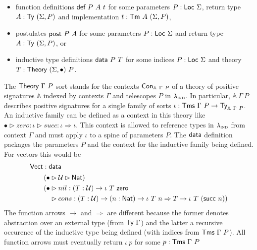 \begin{itemize}
	\item function definitions $\mta{def}\ P\ A\ t$ for some parameters $P : \textsf{Loc}\
		      \Sigma$, return type $A : \textsf{Ty}\ (\Sigma, P)$ and implementation $t : \textsf{Tm}\ A\ (\Sigma, P)$,
	\item postulates $\textsf{post}\ P\ A$ for some parameters $P : \textsf{Loc}\
		      \Sigma$ and return type $A : \textsf{Ty}\ (\Sigma, P)$, or
	\item inductive type definitions $\mta{data}\ P\ T$ for some indices $P :
		      \textsf{Loc}\ \Sigma$ and theory $T : \textsf{Theory}\ (\Sigma, \bullet)\ P$.
\end{itemize}

The $\textsf{Theory}\ \Gamma\ P$ sort stands for the contexts $\textsf{Con}_{\mathbb{A}\ \Gamma\
		P}$ of a theory of positive signatures \cite{Kovacs2023-gq} $\mathbb{A}$ indexed
by contexts $\Gamma$ and telescopes $P$ in $\lambda_{\textsc{ind}}$. In particular,
$\mathbb{A}\ \Gamma\ P$ describes positive signatures for a single family of
sorts $\iota : \Tms\ \Gamma\ P \to \Ty_{\mathbb{A}\ \Gamma\ P}$. An inductive
family can be defined as a context in this theory like $\bullet \rhd zero :
	\iota \rhd succ:\iota \Rightarrow \iota$. This context is allowed to reference
types in $\lambda_{\textsc{ind}}$ from context $\Gamma$ and must apply $\iota$ to a spine of
parameters $P$. The $\textsf{data}$ definition packages the parameters $P$ and the
context for the inductive family being defined. For vectors this would be
\begin{align*}
	 & \mta{Vect} : \mta{data}                                                                                                        \\
	 & \quad\begin{aligned}
		        \quad (\bullet & \rhd\univ \rhd \mta{Nat})\                                                                               \\
		        \quad (\bullet & \rhd nil : (T : \univ) \to \iota\ T\ \mta{zero}                                                          \\
		        \quad          & \rhd cons : (T : \univ) \to (n : \mta{Nat}) \to \iota\ T\ n \Rightarrow T \to \iota\ T\ (\mta{succ}\ n))
	        \end{aligned}
\end{align*}
The function arrows $\to$ and $\Rightarrow$ are different because the former
denotes abstraction over an external type (from $\textsf{Ty}\ \Gamma$) and the latter a
recursive occurence of the inductive type being defined (with indices from
$\textsf{Tms}\ \Gamma\ P$). All function arrows must eventually return $\iota\ p$ for
some $p : \textsf{Tms}\ \Gamma\ P$

